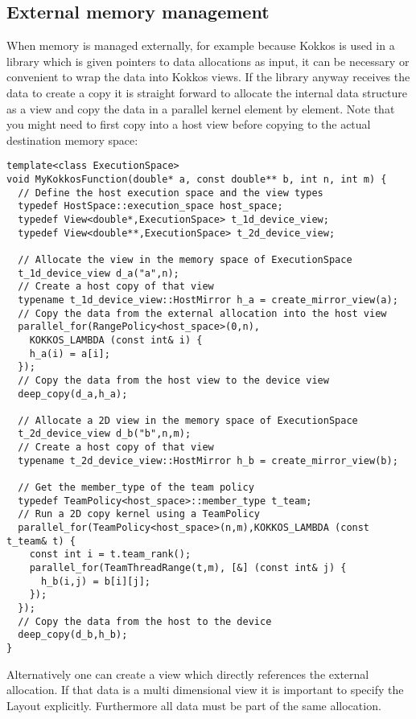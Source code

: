 \subsection{External memory management}

When memory is managed externally, for example because Kokkos is used
in a library which is given pointers to data allocations as input, it can be necessary 
or convenient to wrap the data into Kokkos views. If the library anyway receives the 
data to create a copy it is straight forward to allocate the internal data structure as a
view and copy the data in a parallel kernel element by element. Note that you might
need to first copy into a host view before copying to the actual destination memory 
space:

\begin{lstlisting}
template<class ExecutionSpace>
void MyKokkosFunction(double* a, const double** b, int n, int m) {
  // Define the host execution space and the view types
  typedef HostSpace::execution_space host_space;
  typedef View<double*,ExecutionSpace> t_1d_device_view;
  typedef View<double**,ExecutionSpace> t_2d_device_view;
  
  // Allocate the view in the memory space of ExecutionSpace
  t_1d_device_view d_a("a",n);
  // Create a host copy of that view
  typename t_1d_device_view::HostMirror h_a = create_mirror_view(a);
  // Copy the data from the external allocation into the host view
  parallel_for(RangePolicy<host_space>(0,n),
    KOKKOS_LAMBDA (const int& i) {
    h_a(i) = a[i];
  });
  // Copy the data from the host view to the device view
  deep_copy(d_a,h_a);
  
  // Allocate a 2D view in the memory space of ExecutionSpace
  t_2d_device_view d_b("b",n,m);
  // Create a host copy of that view
  typename t_2d_device_view::HostMirror h_b = create_mirror_view(b);
  
  // Get the member_type of the team policy
  typedef TeamPolicy<host_space>::member_type t_team;
  // Run a 2D copy kernel using a TeamPolicy
  parallel_for(TeamPolicy<host_space>(n,m),KOKKOS_LAMBDA (const t_team& t) {
    const int i = t.team_rank();
    parallel_for(TeamThreadRange(t,m), [&] (const int& j) {
      h_b(i,j) = b[i][j];
    });
  });
  // Copy the data from the host to the device
  deep_copy(d_b,h_b);
}
\end{lstlisting}

Alternatively one can create a view which directly references the external allocation.
If that data is a multi dimensional view it is important to specify the Layout explicitly.
Furthermore all data must be part of the same allocation.

